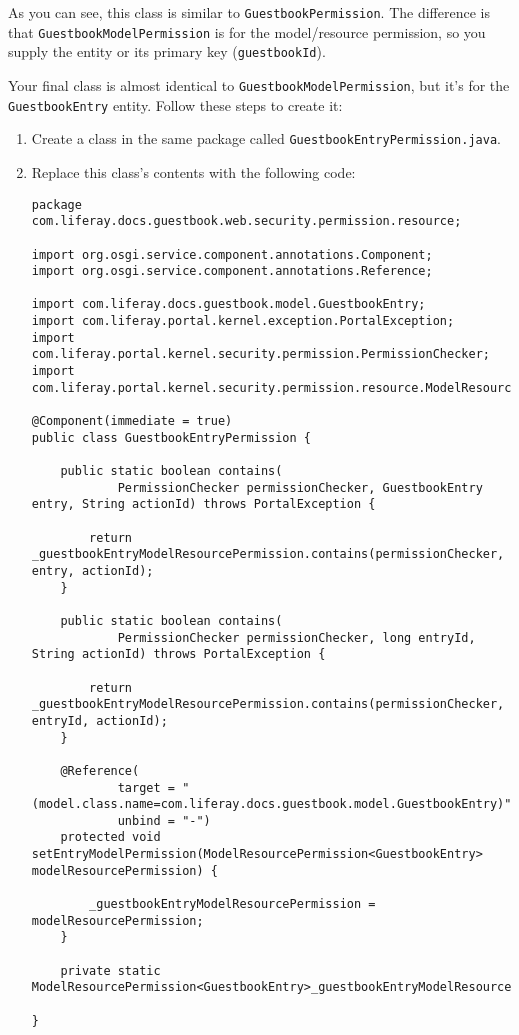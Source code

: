 As you can see, this class is similar to \texttt{GuestbookPermission}.
The difference is that \texttt{GuestbookModelPermission} is for the
model/resource permission, so you supply the entity or its primary key
(\texttt{guestbookId}).

Your final class is almost identical to
\texttt{GuestbookModelPermission}, but it's for the
\texttt{GuestbookEntry} entity. Follow these steps to create it:

\begin{enumerate}
\def\labelenumi{\arabic{enumi}.}
\item
  Create a class in the same package called
  \texttt{GuestbookEntryPermission.java}.
\item
  Replace this class's contents with the following code:

\begin{verbatim}
package com.liferay.docs.guestbook.web.security.permission.resource;

import org.osgi.service.component.annotations.Component;
import org.osgi.service.component.annotations.Reference;

import com.liferay.docs.guestbook.model.GuestbookEntry;
import com.liferay.portal.kernel.exception.PortalException;
import com.liferay.portal.kernel.security.permission.PermissionChecker;
import com.liferay.portal.kernel.security.permission.resource.ModelResourcePermission;

@Component(immediate = true)
public class GuestbookEntryPermission {

    public static boolean contains(
            PermissionChecker permissionChecker, GuestbookEntry entry, String actionId) throws PortalException {

        return _guestbookEntryModelResourcePermission.contains(permissionChecker, entry, actionId);
    }

    public static boolean contains(
            PermissionChecker permissionChecker, long entryId, String actionId) throws PortalException {

        return _guestbookEntryModelResourcePermission.contains(permissionChecker, entryId, actionId);
    }

    @Reference(
            target = "(model.class.name=com.liferay.docs.guestbook.model.GuestbookEntry)",
            unbind = "-")
    protected void setEntryModelPermission(ModelResourcePermission<GuestbookEntry> modelResourcePermission) {

        _guestbookEntryModelResourcePermission = modelResourcePermission;
    }

    private static ModelResourcePermission<GuestbookEntry>_guestbookEntryModelResourcePermission;

}
\end{verbatim}
\end{enumerate}

